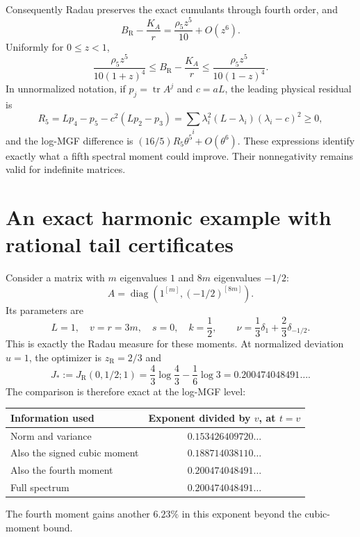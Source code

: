 \documentclass[11pt,letterpaper]{article}
\numberwithin{equation}{section}
\theoremstyle{definition}\newtheorem{definition}[theorem]{Definition}
\theoremstyle{remark}\newtheorem{remark}[theorem]{Remark}
\newcommand{\tr}{\operatorname{tr}}
\newcommand{\diag}{\operatorname{diag}}
\newcommand{\jRad}{J_{\mathrm R}}
\newcommand{\bRad}{B_{\mathrm R}}
\begin{document}
Consequently Radau preserves the exact cumulants through fourth order,
and
\begin{equation}
 \bRad-\frac{K_A}{r}=\frac{\rho_5z^5}{10}+O(z^6).
\end{equation}
Uniformly for $0\le z<1$,
\begin{equation}
 \frac{\rho_5z^5}{10(1+z)^4}
 \le\bRad-\frac{K_A}{r}
 \le\frac{\rho_5z^5}{10(1-z)^4}.
\end{equation}
In unnormalized notation, if $p_j=\tr A^j$ and $c=aL$, the leading
physical residual is
\begin{equation}
 R_5=Lp_4-p_5-c^2(Lp_2-p_3)
 =\sum_i\lambda_i^2(L-\lambda_i)(\lambda_i-c)^2\ge0,
\end{equation}
and the log-MGF difference is $(16/5)R_5\theta^5+O(\theta^6)$.
These expressions identify exactly what a fifth spectral moment could
improve. Their nonnegativity remains valid for indefinite matrices.

\section{An exact harmonic example with rational tail certificates}
\label{sec:exact}

Consider a matrix with $m$ eigenvalues $1$ and $8m$ eigenvalues $-1/2$:
\begin{equation}\label{eq:example}
 A=\diag(1^{[m]},(-1/2)^{[8m]}).
\end{equation}
Its parameters are
\[
 L=1,\quad v=r=3m,\quad s=0,\quad k=\frac12,
 \qquad\nu=\frac13\delta_1+\frac23\delta_{-1/2}.
\]
This is exactly the Radau measure for these moments. At normalized
deviation $u=1$, the optimizer is $z_{\mathrm R}=2/3$ and
\begin{equation}\label{eq:Jexample}
 J_*:=\jRad(0,1/2;1)
 =\frac43\log\frac43-\frac16\log3
 =0.200474048491\ldots.
\end{equation}
The comparison is therefore exact at the log-MGF level:
\begin{center}
\begin{tabular}{@{}lc@{}}
\toprule
Information used & Exponent divided by $v$, at $t=v$\\
\midrule
Norm and variance & $0.153426409720\ldots$\\
Also the signed cubic moment & $0.188714038110\ldots$\\
Also the fourth moment & $0.200474048491\ldots$\\
Full spectrum & $0.200474048491\ldots$\\
\bottomrule
\end{tabular}
\end{center}
The fourth moment gains another $6.23\%$ in this exponent beyond the
cubic-moment bound.
\end{document}
